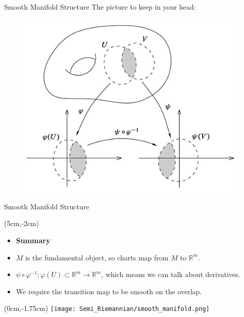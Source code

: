 \documentclass[usenames,dvipsnames]{beamer}
\theoremstyle{definition}
\theoremstyle{theorem}
\newcommand{\R}{\mathbb{R}}
\begin{document}
        
        \begin{frame}{Smooth Manifold Structure}
            The picture to keep in your head:
            \begin{figure}
                \centering
                \includegraphics[scale=.75]{Riemannian_Geometry/smooth_manifold.png}
            \end{figure}
        \end{frame}
        
        
        \begin{frame}{Smooth Manifold Structure}
            \begin{textblock*}{6cm}(5cm,-2cm)
            \begin{itemize}
            \item[] \textbf{Summary}
                \item $M$ is the fundamental object, so charts map from $M$ to $\R^m$.
                \item $\psi \circ \varphi^{-1} \colon \varphi(U)\subset \R^m \to \R^m$,
                which means we can talk about derivatives.
                \item We require the transition map to be smooth on the overlap.
            \end{itemize}
            \end{textblock*}
            \begin{textblock*}{5cm}(0cm,-1.75cm)
            \texttt{[image: Semi\_Riemannian/smooth\_manifold.png]}
            \end{textblock*}
        \end{frame}
        
\end{document}
